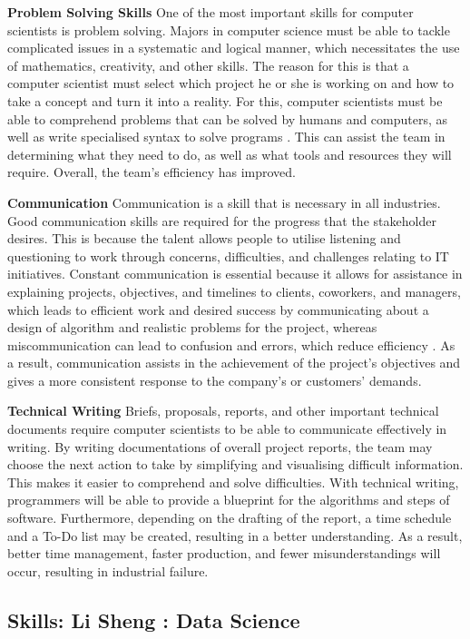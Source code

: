 \documentclass[a4paper, 11pt]{report}
\begin{document}
\textbf{Problem Solving Skills}
  One of the most important skills for computer scientists is problem solving. Majors in computer science must be able to tackle complicated issues in a systematic and logical manner, which necessitates the use of mathematics, creativity, and other skills. The reason for this is that a computer scientist must select which project he or she is working on and how to take a concept and turn it into a reality. For this, computer scientists must be able to comprehend problems that can be solved by humans and computers, as well as write specialised syntax to solve programs \cite{ident}. This can assist the team in determining what they need to do, as well as what tools and resources they will require. Overall, the team's efficiency has improved.

\textbf{Communication}
  Communication is a skill that is necessary in all industries. Good communication skills are required for the progress that the stakeholder desires. This is because the talent allows people to utilise listening and questioning to work through concerns, difficulties, and challenges relating to IT initiatives. Constant communication is essential because it allows for assistance in explaining projects, objectives, and timelines to clients, coworkers, and managers, which leads to efficient work and desired success by communicating about a design of algorithm and realistic problems for the project, whereas miscommunication can lead to confusion and errors, which reduce efficiency \cite{comu}. As a result, communication assists in the achievement of the project's objectives and gives a more consistent response to the company's or customers' demands.

\textbf{Technical Writing}
  Briefs, proposals, reports, and other important technical documents require computer scientists to be able to communicate effectively in writing\cite{tcw}. By writing documentations of overall project reports, the team may choose the next action to take by simplifying and visualising difficult information. This makes it easier to comprehend and solve difficulties. With technical writing, programmers will be able to provide a blueprint for the algorithms and steps of software. Furthermore, depending on the drafting of the report, a time schedule and a To-Do list may be created, resulting in a better understanding. As a result, better time management, faster production, and fewer misunderstandings will occur, resulting in industrial failure.


\subsection{Skills: Li Sheng : Data Science}
\end{document}
